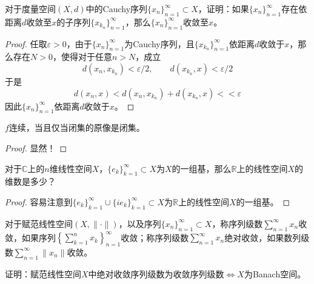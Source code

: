 \documentclass[lang = cn, scheme = chinese, 10pt]{elegantbook}
\newcommand{\R}{\mathbb{R}}  %
\newcommand{\C}{\mathbb{C}}  %
\newcommand{\sub}{\subset}   %
\begin{document}
\begin{proposition}
	对于度量空间$(X,d)$中的Cauchy序列$\{x_n\}_{n=1}^{\infty}\sub X$，证明：如果$\{x_n\}_{n=1}^{\infty}$存在依距离$d$收敛至$x$的子序列$\{x_{k_n}\}_{n=1}^{\infty}$，那么$\{x_n\}_{n=1}^{\infty}$收敛至$x$。
\end{proposition}

\begin{proof}
	任取$\varepsilon>0$，由于$\{x_n\}_{n=1}^{\infty}$为Cauchy序列，且$\{x_{k_n}\}_{n=1}^{\infty}$依距离$d$收敛于$x$，那么存在$N>0$，使得对于任意$n>N$，成立
	$$
	d(x_n,x_{k_n})<\varepsilon/2,\qquad d(x_{k_n},x)<\varepsilon/2
	$$
	于是
	$$
	d(x_n,x)<d(x_n,x_{k_n})+d(x_{k_n},x)<<\varepsilon
	$$
	因此$\{x_n\}_{n=1}^{\infty}$依距离$d$收敛于$x$。
\end{proof}

\begin{proposition}
	$f$连续，当且仅当闭集的原像是闭集。
\end{proposition}

\begin{proof}
	显然！
\end{proof}

\begin{proposition}
	对于$\C$上的$n$维线性空间$X$，$\{e_k\}_{k=1}^{\infty}\sub X$为$X$的一组基，那么$\R$上的线性空间$X$的维数是多少？
\end{proposition}

\begin{proof}
	容易注意到$\{e_k\}_{k=1}^{\infty}\cup \{ie_k\}_{k=1}^{\infty}\sub X$为$\R$上的线性空间$X$的一组基。
\end{proof}

\begin{proposition}
	对于赋范线性空间$(X,\|\cdot\|)$，以及序列$\{x_n\}_{n=1}^{\infty}\sub X$，称序列级数$\displaystyle\sum_{n=1}^{\infty}x_n$收敛，如果序列$\displaystyle\left\{\sum_{k=1}^{n}x_k\right\}_{n=1}^{\infty}$收敛；称序列级数$\displaystyle\sum_{n=1}^{\infty}x_n$绝对收敛，如果数列级数$\displaystyle\sum_{n=1}^{\infty}\|x_n\|$收敛。
	
	证明：赋范线性空间$X$中绝对收敛序列级数为收敛序列级数$\iff X$为Banach空间。
\end{proposition}
\end{document}
